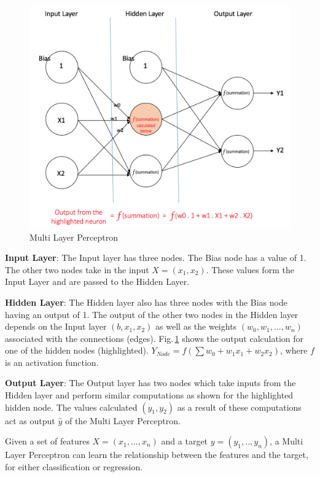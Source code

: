 \begin{figure}[h]
	\centering
	\includegraphics[scale=0.5]{Figs/multilayer.png}
    \caption{Multi Layer Perceptron}
    \label{mlp}
\end{figure}

\textbf{Input Layer}: The Input layer has three nodes. The Bias node has a value of 1. The other two nodes take in the input $X = (x_1,x_2)$. These values form the Input Layer and are passed to the Hidden Layer.

\textbf{Hidden Layer}: The Hidden layer also has three nodes with the Bias node having an output of 1. The output of the other two nodes in the Hidden layer depends on the Input layer $(b, x_1, x_2)$ as well as the weights $(w_0,w_1,...,w_n)$ associated with the connections (edges). Fig.\,\ref{mlp} shows the output calculation for one of the hidden nodes (highlighted). $Y_{Node} = f(\sum{w_0+w_1x_1+w_2x_2})$, where $f$ is an activation function.

\textbf{Output Layer}: The Output layer has two nodes which take inputs from the Hidden layer and perform similar computations as shown for the highlighted hidden node. The values calculated $(y_1,y_2)$ as a result of these computations act as output $\hat{y}$ of the Multi Layer Perceptron.

Given a set of features $X = (x_1,...,x_n)$ and a target $y = (y_1,..,y_n)$, a Multi Layer Perceptron can learn the relationship between the features and the target, for either classification or regression.


